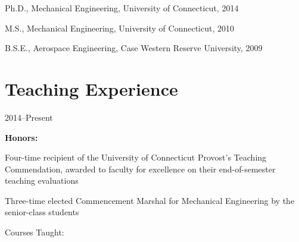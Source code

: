 Ph.D., Mechanical Engineering, University of Connecticut, 2014

M.S., Mechanical Engineering, University of Connecticut, 2010

B.S.E., Aerospace Engineering, Case Western Reserve University, 2009

\section{{\sectionfont{} Teaching Experience}}

 \hfill 2014--Present

\textbf{Honors:}

\begin{innerlist}
    \item Four-time recipient of the University of Connecticut Provost's Teaching Commendation, awarded to faculty for excellence on their end-of-semester teaching evaluations
    \item Three-time elected Commencement Marshal for Mechanical Engineering by the senior-class students
\end{innerlist}

\vspace{0.5\baselineskip}
Courses Taught:

